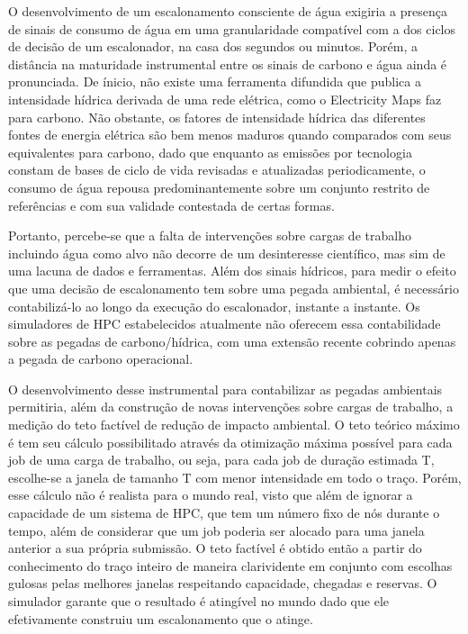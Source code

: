 O desenvolvimento de um escalonamento consciente de água exigiria a presença de sinais de consumo
de água em uma granularidade compatível com a dos ciclos de decisão de um escalonador, na casa dos segundos
ou minutos. Porém, a distância na maturidade instrumental entre os sinais de carbono e água ainda é pronunciada.
De ínicio, não existe uma ferramenta difundida que publica a intensidade hídrica derivada de uma rede elétrica,
como o Electricity Maps faz para carbono. Não obstante, os fatores de intensidade hídrica das diferentes
fontes de energia elétrica são bem menos maduros quando comparados com seus equivalentes para carbono, dado que 
enquanto as emissões por tecnologia constam de bases de ciclo de vida revisadas e atualizadas periodicamente, o
consumo de água repousa predominantemente sobre um conjunto restrito de referências e com sua validade
contestada de certas formas. 

Portanto, percebe-se que a falta de intervenções sobre cargas de trabalho incluindo água como alvo
não decorre de um desinteresse científico, mas sim de uma lacuna de dados e ferramentas. Além dos sinais
hídricos, para medir o efeito que uma decisão de escalonamento tem sobre uma pegada ambiental, é necessário
contabilizá-lo ao longo da execução do escalonador, instante a instante. Os simuladores de HPC 
estabelecidos atualmente não oferecem essa contabilidade sobre as pegadas de carbono/hídrica, com uma
extensão recente cobrindo apenas a pegada de carbono operacional. 

O desenvolvimento desse instrumental para contabilizar as pegadas ambientais permitiria, além da construção
de novas intervenções sobre cargas de trabalho, a medição do teto factível de redução de impacto ambiental.
O teto teórico máximo é tem seu cálculo possibilitado através da otimização máxima possível para cada
job de uma carga de trabalho, ou seja, para cada job de duração estimada T, escolhe-se a janela de tamanho
T com menor intensidade em todo o traço. Porém, esse cálculo não é realista para o mundo real, visto que 
além de ignorar a capacidade de um sistema de HPC, que tem um número fixo de nós durante o tempo, além de 
considerar que um job poderia ser alocado para uma janela anterior a sua própria submissão. O teto factível
é obtido então a partir do conhecimento do traço inteiro de maneira clarividente em conjunto com escolhas
gulosas pelas melhores janelas respeitando capacidade, chegadas e reservas. O simulador garante que o resultado
é atingível no mundo dado que ele efetivamente construiu um escalonamento que o atinge.

